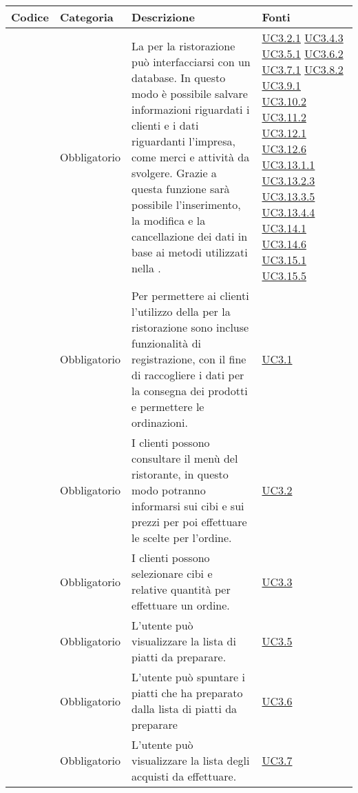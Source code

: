 \begin{longtable}{|P{1.5cm}|P{2.5cm}|P{6.5cm}|P{2.5cm}|}
	\hline \textbf{Codice} & \textbf{Categoria} & \textbf{Descrizione} & \textbf{Fonti} \\
	\hline \RequisitoObF\label{L21} & Obbligatorio & La  per la ristorazione può interfacciarsi con un database. In questo modo è possibile salvare informazioni riguardati i clienti e i dati riguardanti l'impresa, come merci e attività da svolgere. Grazie a questa funzione sarà possibile l'inserimento, la modifica e la cancellazione dei dati in base ai metodi utilizzati nella . & \hyperref[UC3.2.1]{UC3.2.1} \hyperref[UC3.4.3]{UC3.4.3} \hyperref[UC3.5.1]{UC3.5.1} \hyperref[UC3.6.2]{UC3.6.2} \hyperref[UC3.7.1]{UC3.7.1} \hyperref[UC3.8.2]{UC3.8.2} \hyperref[UC3.9.1]{UC3.9.1} \hyperref[UC3.10.2]{UC3.10.2} \hyperref[UC3.11.2]{UC3.11.2} \hyperref[UC3.12.1]{UC3.12.1} \hyperref[UC3.12.6]{UC3.12.6} \hyperref[UC3.13.1.1]{UC3.13.1.1} \hyperref[UC3.13.2.3]{UC3.13.2.3} \hyperref[UC3.13.3.5]{UC3.13.3.5} \hyperref[UC3.13.4.4]{UC3.13.4.4} \hyperref[UC3.14.1]{UC3.14.1} \hyperref[UC3.14.6]{UC3.14.6} \hyperref[UC3.15.1]{UC3.15.1} \hyperref[UC3.15.5]{UC3.15.5} \\
	\hline \RequisitoObF\label{L22} & Obbligatorio & Per permettere ai clienti l'utilizzo della  per la ristorazione sono incluse funzionalità di registrazione, con il fine di raccogliere i dati per la consegna dei prodotti e permettere le ordinazioni. & \hyperref[UC3.1]{UC3.1} \\
	\hline \RequisitoObF\label{L23} & Obbligatorio & I clienti possono consultare il menù del ristorante, in questo modo potranno informarsi sui cibi e sui prezzi per poi effettuare le scelte per l'ordine. & \hyperref[UC3.2]{UC3.2} \\
	\hline \RequisitoObF\label{L24} & Obbligatorio & I clienti possono selezionare cibi e relative quantità per effettuare un ordine. & \hyperref[UC3.3]{UC3.3} \\
	\hline \RequisitoObF\label{L25} & Obbligatorio & L'utente  può visualizzare la lista di piatti da preparare. & \hyperref[UC3.5]{UC3.5} \\
	\hline \RequisitoObF\label{L26} & Obbligatorio & L'utente  può spuntare i piatti che ha preparato dalla lista di piatti da preparare  & \hyperref[UC3.6]{UC3.6} \\
	\hline \RequisitoObF\label{L27} & Obbligatorio & L'utente  può visualizzare la lista degli acquisti da effettuare. & \hyperref[UC3.7]{UC3.7} \\

\end{longtable}
